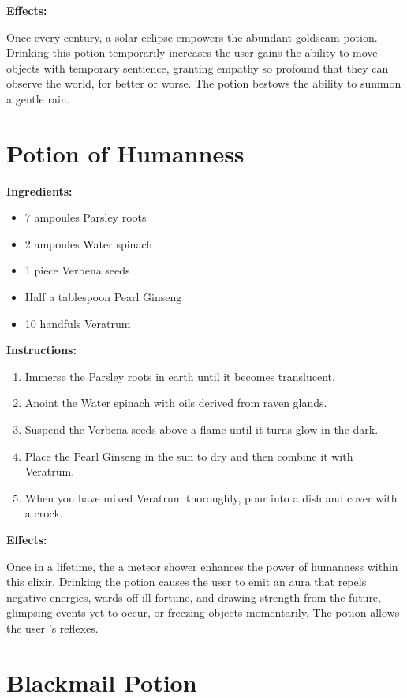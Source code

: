 \documentclass{article}
\begin{document}
\textbf{Effects:}

Once every century, a solar eclipse empowers the abundant goldseam potion. Drinking this potion temporarily increases the user gains the ability to move objects with temporary sentience, granting empathy so profound that they can observe the world, for better or worse. The potion bestows the ability to summon a gentle rain.

\newpage
\section*{Potion of Humanness}

\textbf{Ingredients:}

\begin{itemize}
  \item 7 ampoules Parsley roots
  \item 2 ampoules Water spinach
  \item 1 piece Verbena seeds
  \item Half a tablespoon Pearl Ginseng
  \item 10 handfuls Veratrum
\end{itemize}

\textbf{Instructions:}

\begin{enumerate}
  \item Immerse the Parsley roots in earth until it becomes translucent.
  \item Anoint the Water spinach with oils derived from raven glands.
  \item Suspend the Verbena seeds above a flame until it turns glow in the dark.
  \item Place the Pearl Ginseng in the sun to dry and then combine it with Veratrum.
  \item When you have mixed Veratrum thoroughly, pour into a dish and cover with a crock.
\end{enumerate}

\textbf{Effects:}

Once in a lifetime, the a meteor shower enhances the power of humanness within this elixir. Drinking the potion causes the user to emit an aura that repels negative energies, wards off ill fortune, and drawing strength from the future, glimpsing events yet to occur, or freezing objects momentarily. The potion allows the user 's reflexes.

\newpage
\section*{Blackmail Potion}
\end{document}
